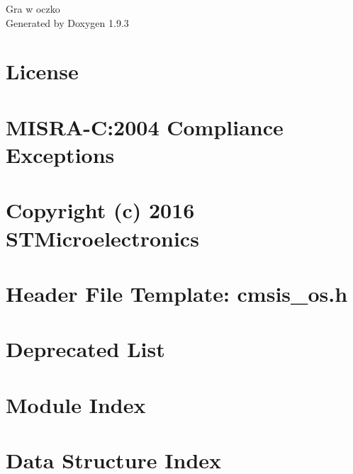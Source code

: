 \documentclass[twoside]{book}
\newcommand{\+}{\discretionary{\mbox{\scriptsize$\hookleftarrow$}}{}{}}
\newcommand{\clearemptydoublepage}{%
    \newpage{\pagestyle{empty}\cleardoublepage}%
  }
\begin{document}
  \raggedbottom
  \begin{titlepage}
  \vspace*{7cm}
  \begin{center}%
  {\Large Gra w oczko}\\
  \vspace*{1cm}
  {\large Generated by Doxygen 1.9.3}\\
  \end{center}
  \end{titlepage}
  \clearemptydoublepage
  \tableofcontents
  \clearemptydoublepage
\chapter{License}
\label{md__c___a_l_l__s_t_m32__projekty__oczko_gierka__drivers__c_m_s_i_s__device__s_t__s_t_m32_f4xx__license}

\chapter{MISRA-\/C\+:2004 Compliance Exceptions}
\label{_c_m_s_i_s__m_i_s_r_a__exceptions}

\chapter{Copyright (c) 2016 STMicroelectronics}
\label{md__c___a_l_l__s_t_m32__projekty__oczko_gierka__drivers__s_t_m32_f4xx__h_a_l__driver__license}

\chapter{Header File Template\+: cmsis\+\_\+os.\+h}
\label{cmsis_os_h}

\chapter{Deprecated List}
\label{deprecated}

\chapter{Module Index}

\chapter{Data Structure Index}

\end{document}
